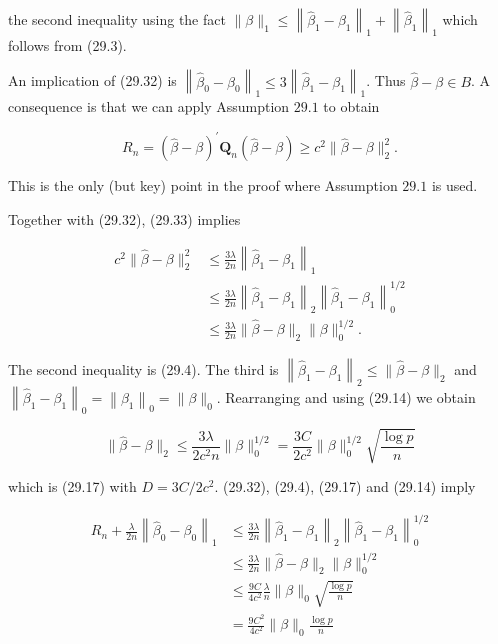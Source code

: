 \documentclass[10pt]{article}
\begin{document}
the second inequality using the fact $\|\beta\|_{1} \leq\left\|\widehat{\beta}_{1}-\beta_{1}\right\|_{1}+\left\|\widehat{\beta}_{1}\right\|_{1}$ which follows from (29.3).

An implication of (29.32) is $\left\|\widehat{\beta}_{0}-\beta_{0}\right\|_{1} \leq 3\left\|\widehat{\beta}_{1}-\beta_{1}\right\|_{1}$. Thus $\widehat{\beta}-\beta \in B$. A consequence is that we can apply Assumption $29.1$ to obtain

$$
R_{n}=(\widehat{\beta}-\beta)^{\prime} \boldsymbol{Q}_{n}(\widehat{\beta}-\beta) \geq c^{2}\|\widehat{\beta}-\beta\|_{2}^{2} .
$$

This is the only (but key) point in the proof where Assumption $29.1$ is used.

Together with (29.32), (29.33) implies

$$
\begin{aligned}
c^{2}\|\widehat{\beta}-\beta\|_{2}^{2} & \leq \frac{3 \lambda}{2 n}\left\|\widehat{\beta}_{1}-\beta_{1}\right\|_{1} \\
& \leq \frac{3 \lambda}{2 n}\left\|\widehat{\beta}_{1}-\beta_{1}\right\|_{2}\left\|\widehat{\beta}_{1}-\beta_{1}\right\|_{0}^{1 / 2} \\
& \leq \frac{3 \lambda}{2 n}\|\widehat{\beta}-\beta\|_{2}\|\beta\|_{0}^{1 / 2} .
\end{aligned}
$$

The second inequality is (29.4). The third is $\left\|\widehat{\beta}_{1}-\beta_{1}\right\|_{2} \leq\|\widehat{\beta}-\beta\|_{2}$ and $\left\|\widehat{\beta}_{1}-\beta_{1}\right\|_{0}=\left\|\beta_{1}\right\|_{0}=\|\beta\|_{0}$. Rearranging and using (29.14) we obtain

$$
\|\widehat{\beta}-\beta\|_{2} \leq \frac{3 \lambda}{2 c^{2} n}\|\beta\|_{0}^{1 / 2}=\frac{3 C}{2 c^{2}}\|\beta\|_{0}^{1 / 2} \sqrt{\frac{\log p}{n}}
$$

which is (29.17) with $D=3 C / 2 c^{2}$. (29.32), (29.4), (29.17) and (29.14) imply

$$
\begin{aligned}
R_{n}+\frac{\lambda}{2 n}\left\|\widehat{\beta}_{0}-\beta_{0}\right\|_{1} & \leq \frac{3 \lambda}{2 n}\left\|\widehat{\beta}_{1}-\beta_{1}\right\|_{2}\left\|\widehat{\beta}_{1}-\beta_{1}\right\|_{0}^{1 / 2} \\
& \leq \frac{3 \lambda}{2 n}\|\widehat{\beta}-\beta\|_{2}\|\beta\|_{0}^{1 / 2} \\
& \leq \frac{9 C}{4 c^{2}} \frac{\lambda}{n}\|\beta\|_{0} \sqrt{\frac{\log p}{n}} \\
&=\frac{9 C^{2}}{4 c^{2}}\|\beta\|_{0} \frac{\log p}{n}
\end{aligned}
$$
\end{document}
